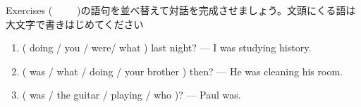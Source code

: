 \documentclass[aspectratio=169,xcolor={dvipsnames,table}]{beamer}
\begin{document}
\begin{frame}[plain]{Exercises}
(~~~~~)の語句を並べ替えて対話を完成させましょう。文頭にくる語は大文字で書きはじめてください
\begin{enumerate}
 \item ( doing / you / were/ what ) last night?
--- I was studying history. \\
 \item ( was / what / doing / your brother ) then?
--- He was cleaning his room.\\
 \item ( was / the guitar / playing / who )? --- Paul was.\\
\end{enumerate}
\hfill{}


\end{frame}
\end{document}
